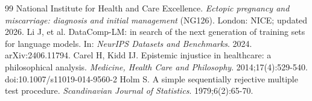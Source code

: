 \documentclass[11pt,twocolumn]{article}
\begin{document}
\begin{thebibliography}{99}
 National Institute for Health and Care Excellence. \emph{Ectopic pregnancy and miscarriage: diagnosis and initial management} (NG126). London: NICE; updated 2026.
 Li J, et al. DataComp-LM: in search of the next generation of training sets for language models. In: \emph{NeurIPS Datasets and Benchmarks}. 2024. arXiv:2406.11794.
 Carel H, Kidd IJ. Epistemic injustice in healthcare: a philosophical analysis. \emph{Medicine, Health Care and Philosophy}. 2014;17(4):529-540. doi:10.1007/s11019-014-9560-2
 Holm S. A simple sequentially rejective multiple test procedure. \emph{Scandinavian Journal of Statistics}. 1979;6(2):65-70.
\end{thebibliography}



\end{document}
